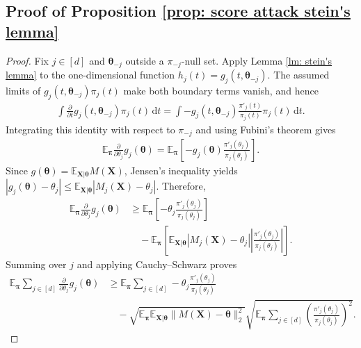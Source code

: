 \documentclass[letterpaper,12pt]{article}
\renewcommand{\d}{\mathrm{d}}
\numberwithin{equation}{section}
\theoremstyle{plain}
\numberwithin{Theorem}{section}
\numberwithin{proposition}{section}
\numberwithin{Lemma}{section}
{
	\theoremstyle{definition}
	\newtheorem{Definition}{Definition}
	\newtheorem{example}{Example}
	\numberwithin{example}{section}
	\newtheorem{fact}{Fact}
	\numberwithin{fact}{section}
	\newtheorem{remark}{Remark}
}
\newcommand{\1}{\mathbbm{1}}
\def\bth{{\boldsymbol{\theta}}}
\def\E{\mathbb{E}}
\begin{document}
\subsection{Proof of Proposition \ref{prop: score attack stein's lemma}}\label{sec: proof of prop: score attack stein's lemma}
\begin{proof}
	{
		Fix $j\in[d]$ and $\bth_{-j}$ outside a $\pi_{-j}$-null set. Apply Lemma \ref{lm: stein's lemma} to the one-dimensional function $h_j(t)=g_j(t,\bth_{-j})$. The assumed limits of $g_j(t,\bth_{-j})\pi_j(t)$ make both boundary terms vanish, and hence
	\begin{align*}
		\int \frac{\partial}{\partial t}g_j(t,\bth_{-j})\pi_j(t)\,\d t
		=\int -g_j(t,\bth_{-j})\frac{\pi'_j(t)}{\pi_j(t)}\pi_j(t)\,\d t.
	\end{align*}
	Integrating this identity with respect to $\pi_{-j}$ and using Fubini's theorem gives
	\begin{align*}
		\E_{\bm\pi}\frac{\partial}{\partial\theta_j}g_j(\bth)
		=\E_{\bm\pi}\left[-g_j(\bth)\frac{\pi'_j(\theta_j)}{\pi_j(\theta_j)}\right].
	\end{align*}
	Since $g(\bth)=\E_{\bm X|\bth}M(\bm X)$, Jensen's inequality yields
	$|g_j(\bth)-\theta_j|\leq\E_{\bm X|\bth}|M_j(\bm X)-\theta_j|$. Therefore,
	\begin{align*}
		\E_{\bm\pi}\frac{\partial}{\partial\theta_j}g_j(\bth)
		&\geq \E_{\bm\pi}\left[-\theta_j\frac{\pi'_j(\theta_j)}{\pi_j(\theta_j)}\right]\\
		&\quad-\E_{\bm\pi}\left[\E_{\bm X|\bth}|M_j(\bm X)-\theta_j|
		\left|\frac{\pi'_j(\theta_j)}{\pi_j(\theta_j)}\right|\right].
	\end{align*}
	Summing over $j$ and applying Cauchy--Schwarz proves
	\begin{align*}
		\E_{\bm\pi}\sum_{j\in[d]}\frac{\partial}{\partial\theta_j}g_j(\bth)
		&\geq \E_{\bm\pi}\sum_{j\in[d]}-\theta_j\frac{\pi'_j(\theta_j)}{\pi_j(\theta_j)}\\
		&\quad-\sqrt{\E_{\bm\pi}\E_{\bm X|\bth}\|M(\bm X)-\bth\|_2^2}
		\sqrt{\E_{\bm\pi}\sum_{j\in[d]}\left(\frac{\pi'_j(\theta_j)}{\pi_j(\theta_j)}\right)^2}.
	\end{align*}
	}
\end{proof}

	
	
	
		\label{lastpage}
	
	\newpage
	\appendix
\end{document}
